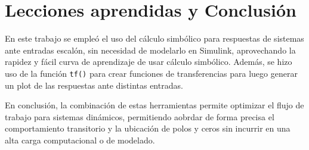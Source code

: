 \documentclass[twoside]{article}
\begin{document}
\newpage

\section{Lecciones aprendidas y Conclusión}
En este trabajo se empleó el uso del cálculo simbólico para respuestas de sistemas ante entradas escalón, sin necesidad de modelarlo en Simulink, aprovechando la rapidez y fácil curva de aprendizaje de usar cálculo simbólico. Además, se hizo uso de la función \texttt{tf()} para crear funciones de transferencias para luego generar un plot de las respuestas ante distintas entradas. 

En conclusión, la combinación de estas herramientas permite optimizar el flujo de trabajo para sistemas dinámicos, permitiendo aobrdar de forma precisa el comportamiento transitorio y la ubicación de polos y ceros sin incurrir en una alta carga computacional o de modelado.





\newpage
\thispagestyle{empty}


\end{document}
